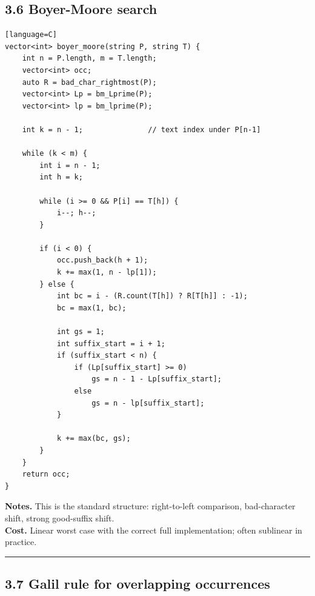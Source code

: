 \documentclass[11pt]{article}
\begin{document}
\subsection{3.6 Boyer-Moore search}\label{boyer-moore-search}

\begin{verbatim}[language=C]
vector<int> boyer_moore(string P, string T) {
    int n = P.length, m = T.length;
    vector<int> occ;
    auto R = bad_char_rightmost(P);
    vector<int> Lp = bm_Lprime(P);
    vector<int> lp = bm_lprime(P);

    int k = n - 1;               // text index under P[n-1]

    while (k < m) {
        int i = n - 1;
        int h = k;

        while (i >= 0 && P[i] == T[h]) {
            i--; h--;
        }

        if (i < 0) {
            occ.push_back(h + 1);
            k += max(1, n - lp[1]);
        } else {
            int bc = i - (R.count(T[h]) ? R[T[h]] : -1);
            bc = max(1, bc);

            int gs = 1;
            int suffix_start = i + 1;
            if (suffix_start < n) {
                if (Lp[suffix_start] >= 0)
                    gs = n - 1 - Lp[suffix_start];
                else
                    gs = n - lp[suffix_start];
            }

            k += max(bc, gs);
        }
    }
    return occ;
}
\end{verbatim}

\textbf{Notes.} This is the standard structure: right-to-left comparison, bad-character shift, strong good-suffix shift.\\
\textbf{Cost.} Linear worst case with the correct full implementation; often sublinear in practice.

\begin{center}\rule{0.5\linewidth}{0.5pt}\end{center}

\subsection{3.7 Galil rule for overlapping occurrences}\label{galil-rule-for-overlapping-occurrences}
\end{document}
